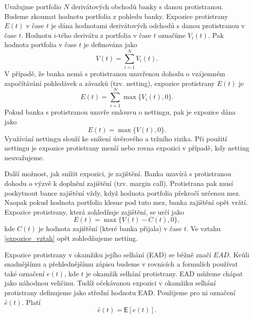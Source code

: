 \documentclass[a4paper,12pt]{report}
\theoremstyle{definition} \newtheorem{definice}[veta]{Definice}
\theoremstyle{remark}
\begin{document}
Uvažujme portfolio $N$ derivátových obchodů banky s danou protistranou.
Budeme zkoumat hodnotu portfolia z pohledu banky.
Expozice protistrany $E(t)$ v čase $t$ je dána hodnotami derivátových odchodů s danou protistranou v čase $t$.
Hodnotu $i$-tého derivátu z portfolia v čase $t$  označíme $V_i(t)$.
Pak hodnota portfolia v čase $t$ je definována jako
\begin{equation}
V(t)=\sum_{i=1}^N V_i(t).
\end{equation}
V případě, že banka nemá s protistranou uzavřenou dohodu o vzájemném započítávání pohledávek a závazků (tzv. netting), expozice protistrany $E(t)$ je 
\begin{equation}\label{exp_vztah}
E(t)=\sum_{i=1}^N\max\{V_i(t),0\}.
\end{equation}
Pokud banka s protistranou uzavře smlouvu o nettingu, pak je expozice dána jako
\begin{equation}\label{exp_vztah_net}
E(t)=\max\{V(t),0\}.
\end{equation}
Využívání nettingu slouží ke snížení úvěrového a tržního rizika. 
Při použití nettingu je expozice protistrany menší nebo rovna expozici v případě, kdy netting neuvažujeme. 

Další možnost, jak snížit expozici, je zajištění.
Banka uzavírá s protistranou dohodu o výzvě k doplnění zajištění (tzv. margin call).
Protistrana pak musí poskytnout bance zajištění vždy, když hodnota portfolia překročí určenou mez.
Naopak pokud hodnota portfolia klesne pod tuto mez, banka zajištění opět vrátí.
Expozice protistrany, která zohledňuje zajištění, se určí jako
\begin{equation}\label{expozice_vztah}
E(t)=\max\{V(t)-C(t),0\},
\end{equation}
kde $C(t)$ je hodnota zajištění (které banka přijala) v čase $t$.  
Ve vztahu \eqref{expozice_vztah} opět zohledňujeme netting.

Expozice protistrany v okamžiku jejího selhání (EAD) se běžně značí $EAD$.
Kvůli snadnějšímu a přehlednějšímu zápisu budeme v rovnicích a formulích používat také označení $e(t)$, kde $t$ je okamžik selhání protistrany.
EAD můžeme chápat jako náhodnou veličinu.
Tudíž očekávanou expozici v okamžiku selhání protistrany definujeme jako střední hodnotu EAD. Použijeme pro ni označení $\hat{e}(t)$.
Platí
\begin{equation}
\hat{e}(t)=\mathsf{E}[e(t)].
\end{equation}
\end{document}
